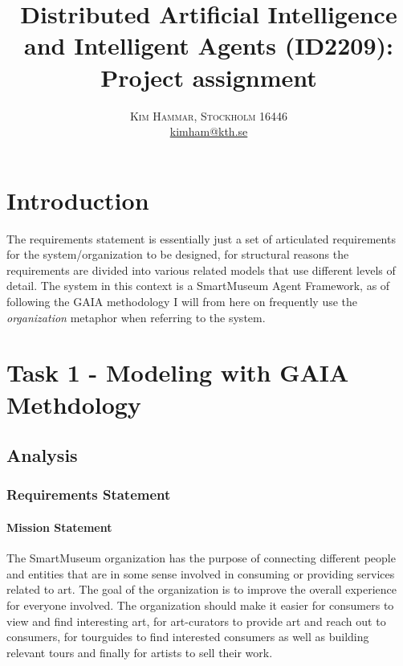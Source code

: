 \documentclass[paper=letter, fontsize=12pt]{article}
\title{\vspace{-15mm}\fontsize{24pt}{10pt}\selectfont\textbf{Distributed Artificial Intelligence and Intelligent Agents (ID2209): Project assignment}} %
\author{
\large
{\textsc{Kim Hammar, Stockholm 16446 }}\\[2mm]
\normalsize \href{mailto:kimham@kth.se}{kimham@kth.se}\\[2mm] %
}
\date{}
\begin{document}
\maketitle %
\thispagestyle{fancy} %


\section{Introduction}
The requirements statement is essentially just a set of articulated requirements for the system/organization to be designed, for structural reasons the requirements are divided into various related models that use different levels of detail. The system in this context is a SmartMuseum Agent Framework, as of following the GAIA methodology \citep{wooldrigde_jennings} I will from here on frequently use the \textit{organization} metaphor when referring to the system.
\section{Task 1 - Modeling with GAIA Methdology}
\subsection{Analysis}
\subsubsection{Requirements Statement}
\paragraph{Mission Statement}
The SmartMuseum organization has the purpose of connecting different people and entities that are in some sense involved in consuming or providing services related to art. The goal of the organization is to improve the overall experience for everyone involved. The organization should make it easier for consumers to view and find interesting art, for art-curators to provide art and reach out to consumers, for tourguides to find interested consumers as well as building relevant tours and finally for artists to sell their work.
\end{document}
